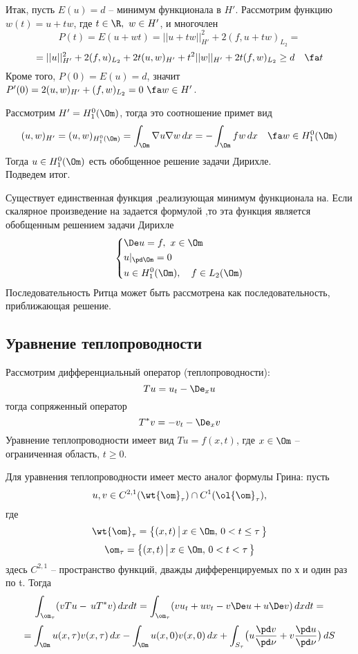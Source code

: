 \documentclass[a4paper,draft]{article}
\begin{document}
Итак, пусть $E(u)=d$ -- минимум функционала в $H'$. Рассмотрим
 функцию $w(t)=u+tw$, где $t\in\R,\ w\in H'$, и многочлен
$$
P(t)=E(u+wt)=||u+tw||^2_{H'}+2(f,u+tw)_{L_2}=
$$
$$
=||u||^2_{H'}+2(f,u)_{L_2}+2t(u,w)_{H'}+t^2||w||_{H'}+2t(f,w)_{L_2}\ge
d \quad \fa t
$$
Кроме того, $P(0)=E(u)=d$, значит
$P'(0)=2(u,w)_{H'}+(f,w)_{L_2}=0\ \fa w\in H'$.

Рассмотрим $H'=H_1^0(\Om)$, тогда это соотношение примет вид
$$
(u,w)_{H'}=(u,w)_{H_1^0(\Om)}=\int_\Om \nabla u \nabla w\,dx
= -\int_\Om fw\,dx \quad \fa w \in H_1^0(\Om)
$$
Тогда $u\in H_1^0(\Om)$ есть обобщенное решение задачи
Дирихле.\\

Подведем итог.
\begin{theorem}
Существует единственная функция ,реализующая минимум функционала
на. Если скалярное произведение на задается формулой ,то эта
функция является обобщенным решением задачи Дирихле
$$
 \left\{
\begin{aligned}
&\De u=f,\ x\in\Om\\
&u|_{\pd\Om}=0\\
&u\in H_1^0(\Om),\quad f\in L_2(\Om)\\
\end{aligned}
\right.
$$
Последовательность Ритца может быть рассмотрена как
последовательность, приближающая решение.
\end{theorem}






\subsection {Уравнение теплопроводности}
Рассмотрим дифференциальный оператор (теплопроводности):
$$
Tu=u_t-\De_x u
$$
тогда сопряженный оператор
$$
T^*v=-v_t-\De_x v
$$
Уравнение теплопроводности имеет вид $Tu=f(x,t)$, где $x\in\Om$
-- ограниченная область, $t\ge 0$.

Для уравнения теплопроводности имеет место аналог формулы Грина:
пусть
$$
u,v\in C^{2,1}(\wt{\om}_\tau)\cap
C^1(\ol{\om}_\tau),
$$
где
$$
\wt{\om}_\tau=\bigl\{(x,t)\,\bigl|\,x\in\Om,\,0<t\le\tau\,\bigr\}
$$
$$
\om_\tau=\bigl\{(x,t)\,\bigl|\,x\in\Om,\,0<t<\tau\,\bigr\}
$$
здесь $C^{2,1}$ -- пространство функций, дважды дифференцируемых
по х и один раз по t. Тогда
$$
\int_{\om_\tau}(vTu-\,uT^*v)\,dxdt=\int_{\om_\tau}(vu_t+uv_t-v\De
u+u\De v )\,dxdt=
$$
$$
=\int_\Om u(x,\tau) v(x,\tau)\,dx-\int_\Om u(x,0)
v(x,0)\,dx+\int_{S_\tau} \bigl(u \frac{\pd v}{\pd \nu}+v
\frac{\pd u}{\pd \nu}\bigr)\,dS
$$\\
\end{document}
